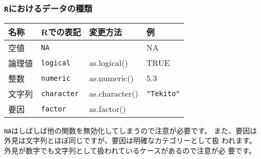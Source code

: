 	\subsubsection{\texttt{R}におけるデータの種類}
\noindent {}
\begin{table}[htb]
 \begin{center}
  \begin{tabular}{llll} \toprule
名称 & Rでの表記 & 変更方法 & 例 \\ \midrule
空値 & \verb|NA| &  & NA \\
論理値 & \verb|logical| & as.logical() & TRUE \\
整数 & \verb|numeric| & as.numeric() & 5.3 \\
文字列 & \verb|character| & as.character() & \verb|"Tekito"| \\
要因 & \verb|factor| & as.factor() & \\ \bottomrule
  \end{tabular}
 \end{center}
\end{table}

\verb|NA|はしばしば他の関数を無効化してしまうので注意が必要です。
また、要因は外見は文字列とほぼ同じですが、要因は明確なカテゴリーとして扱
われます。外見が数字でも文字列として扱われているケースがあるので注意が必
要です。

